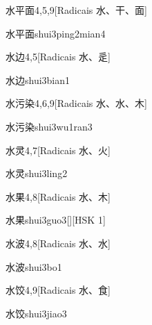 \begin{entry}{水平面}{4,5,9}[Radicais ⽔、⼲、⾯]
  \begin{phonetics}{水平面}{shui3ping2mian4}
  \end{phonetics}
\end{entry}

\begin{entry}{水边}{4,5}[Radicais ⽔、⾡]
  \begin{phonetics}{水边}{shui3bian1}
  \end{phonetics}
\end{entry}

\begin{entry}{水污染}{4,6,9}[Radicais ⽔、⽔、⽊]
  \begin{phonetics}{水污染}{shui3wu1ran3}
  \end{phonetics}
\end{entry}

\begin{entry}{水灵}{4,7}[Radicais ⽔、⽕]
  \begin{phonetics}{水灵}{shui3ling2}
  \end{phonetics}
\end{entry}

\begin{entry}{水果}{4,8}[Radicais ⽔、⽊]
  \begin{phonetics}{水果}{shui3guo3}[][HSK 1]
  \end{phonetics}
\end{entry}

\begin{entry}{水波}{4,8}[Radicais ⽔、⽔]
  \begin{phonetics}{水波}{shui3bo1}
  \end{phonetics}
\end{entry}

\begin{entry}{水饺}{4,9}[Radicais ⽔、⾷]
  \begin{phonetics}{水饺}{shui3jiao3}
  \end{phonetics}
\end{entry}

